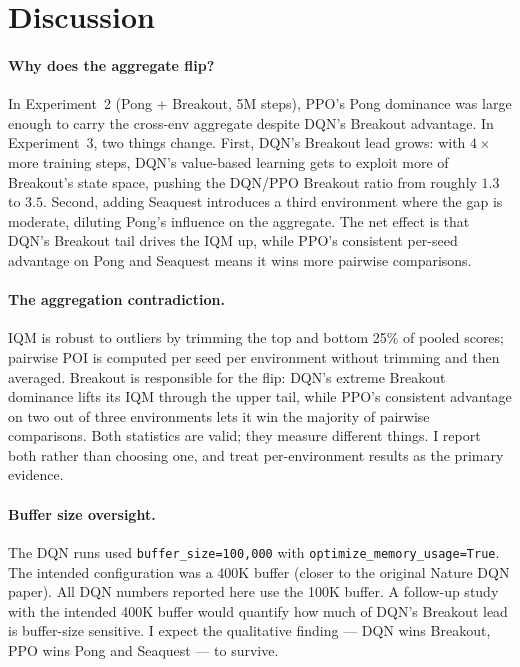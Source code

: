 \section{Discussion}
\label{sec:exp3-discussion}

\paragraph{Why does the aggregate flip?}
In Experiment~2 (Pong + Breakout, 5M steps), PPO's Pong dominance was large enough to carry the cross-env aggregate despite DQN's Breakout advantage. In Experiment~3, two things change. First, DQN's Breakout lead grows: with $4\times$ more training steps, DQN's value-based learning gets to exploit more of Breakout's state space, pushing the DQN/PPO Breakout ratio from roughly $1.3$ to $3.5$. Second, adding Seaquest introduces a third environment where the gap is moderate, diluting Pong's influence on the aggregate. The net effect is that DQN's Breakout tail drives the IQM up, while PPO's consistent per-seed advantage on Pong and Seaquest means it wins more pairwise comparisons.

\paragraph{The aggregation contradiction.}
IQM is robust to outliers by trimming the top and bottom 25\% of pooled scores; pairwise POI is computed per seed per environment without trimming and then averaged. Breakout is responsible for the flip: DQN's extreme Breakout dominance lifts its IQM through the upper tail, while PPO's consistent advantage on two out of three environments lets it win the majority of pairwise comparisons. Both statistics are valid; they measure different things. I report both rather than choosing one, and treat per-environment results as the primary evidence.

\paragraph{Buffer size oversight.}
The DQN runs used \texttt{buffer\_size=100{,}000} with \texttt{optimize\_memory\_usage=True}. The intended configuration was a 400K buffer (closer to the original Nature DQN paper). All DQN numbers reported here use the 100K buffer. A follow-up study with the intended 400K buffer would quantify how much of DQN's Breakout lead is buffer-size sensitive. I expect the qualitative finding --- DQN wins Breakout, PPO wins Pong and Seaquest --- to survive.
